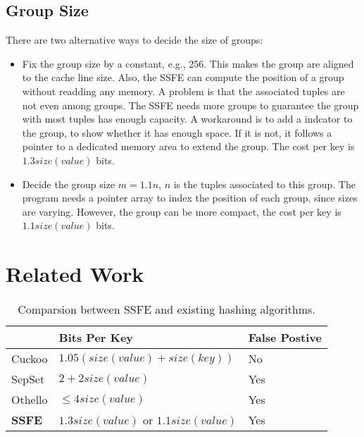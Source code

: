 \documentclass{article}
\begin{document}
\subsection{Group Size}

There are two alternative ways to decide the size of groups:

\begin{itemize}
    \item Fix the group size by a constant, e.g., 256. This makes the group are aligned to the cache line size. Also, the SSFE can compute the position of a group without readding any memory. A problem is that the associated tuples are not even among groups. The SSFE needs more groups to guarantee the group with most tuples has enough capacity. A workaround is to add a indcator to the group, to show whether it has enough space. If it is not, it follows a pointer to a dedicated memory area to extend the group. The cost per key is $1.3 size(value)$ bits.
    \item Decide the group size $m = 1.1n$, $n$ is the tuples associated to this group. The program needs a pointer array to index the position of each group, since sizes are varying. However, the group can be more compact, the cost per key is $1.1 size(value)$ bits.
\end{itemize}

\section{Related Work}
\label{sec:related_work}

\begin{table}[]
    \centering
    \begin{tabular}{lll}
        \hline
                  & Bits Per Key                     & False Postive \\ \hline\hline
    Cuckoo\cite{zhou2013scalable}        & $1.05 (size(value) + size(key))$ & No            \\ \hline
    SepSet\cite{zhou2015scaling}        & $2 + 2 size(value)$              & Yes           \\ \hline
    Othello\cite{yu2018memory}       & $\le 4 size(value)$              & Yes           \\ \hline
    \textbf{SSFE} & $1.3 size(value)$  or $1.1 size(value)$ & Yes     
    \\ \hline
    \end{tabular}
    \caption{Comparsion between SSFE and existing hashing algorithms.}
    \label{tab:comparsion}
\end{table}
\end{document}
